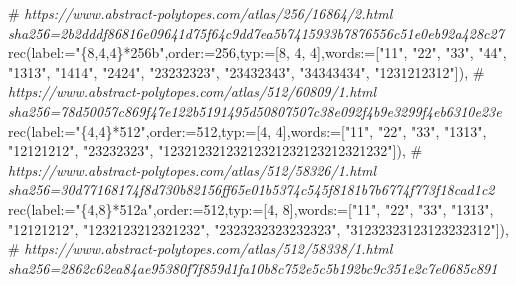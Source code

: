 \documentclass[
  10pt,
  letterpaper,
]{article}
\newenvironment{Shaded}{}{}
\newcommand{\CommentTok}[1]{\textcolor[rgb]{0.38,0.63,0.69}{\textit{#1}}}
\newcommand{\ExtensionTok}[1]{#1}
\newcommand{\FloatTok}[1]{\textcolor[rgb]{0.25,0.63,0.44}{#1}}
\newcommand{\NormalTok}[1]{#1}
\newcommand{\OperatorTok}[1]{\textcolor[rgb]{0.40,0.40,0.40}{#1}}
\newcommand{\StringTok}[1]{\textcolor[rgb]{0.25,0.44,0.63}{#1}}
\newcommand{\VariableTok}[1]{\textcolor[rgb]{0.10,0.09,0.49}{#1}}
\begin{document}
\begin{Shaded}
\begin{Highlighting}[]
\NormalTok{\#}\CommentTok{ https://www.abstract{-}polytopes.com/atlas/256/16864/2.html sha256=2b2dddf86816e09641d75f64c9dd7ea5b7415933b7876556c51e0eb92a428c27}
\ExtensionTok{rec}\NormalTok{(}\VariableTok{label}\OperatorTok{:=}\StringTok{"\{8,4,4\}*256b"}\OperatorTok{,}\VariableTok{order}\OperatorTok{:=}\FloatTok{256}\OperatorTok{,}\VariableTok{typ}\OperatorTok{:=}\NormalTok{[}\FloatTok{8}\OperatorTok{,} \FloatTok{4}\OperatorTok{,} \FloatTok{4}\NormalTok{]}\OperatorTok{,}\VariableTok{words}\OperatorTok{:=}\NormalTok{[}\StringTok{"11"}\OperatorTok{,} \StringTok{"22"}\OperatorTok{,} \StringTok{"33"}\OperatorTok{,} \StringTok{"44"}\OperatorTok{,} \StringTok{"1313"}\OperatorTok{,} \StringTok{"1414"}\OperatorTok{,} \StringTok{"2424"}\OperatorTok{,} \StringTok{"23232323"}\OperatorTok{,} \StringTok{"23432343"}\OperatorTok{,} \StringTok{"34343434"}\OperatorTok{,} \StringTok{"1231212312"}\NormalTok{])}\OperatorTok{,}
\NormalTok{\#}\CommentTok{ https://www.abstract{-}polytopes.com/atlas/512/60809/1.html sha256=78d50057c869f47e122b5191495d50807507c38e092f4b9e3299f4eb6310e23e}
\ExtensionTok{rec}\NormalTok{(}\VariableTok{label}\OperatorTok{:=}\StringTok{"\{4,4\}*512"}\OperatorTok{,}\VariableTok{order}\OperatorTok{:=}\FloatTok{512}\OperatorTok{,}\VariableTok{typ}\OperatorTok{:=}\NormalTok{[}\FloatTok{4}\OperatorTok{,} \FloatTok{4}\NormalTok{]}\OperatorTok{,}\VariableTok{words}\OperatorTok{:=}\NormalTok{[}\StringTok{"11"}\OperatorTok{,} \StringTok{"22"}\OperatorTok{,} \StringTok{"33"}\OperatorTok{,} \StringTok{"1313"}\OperatorTok{,} \StringTok{"12121212"}\OperatorTok{,} \StringTok{"23232323"}\OperatorTok{,} \StringTok{"12321232123212321232123212321232"}\NormalTok{])}\OperatorTok{,}
\NormalTok{\#}\CommentTok{ https://www.abstract{-}polytopes.com/atlas/512/58326/1.html sha256=30d77168174f8d730b82156ff65e01b5374c545f8181b7b6774f773f18cad1c2}
\ExtensionTok{rec}\NormalTok{(}\VariableTok{label}\OperatorTok{:=}\StringTok{"\{4,8\}*512a"}\OperatorTok{,}\VariableTok{order}\OperatorTok{:=}\FloatTok{512}\OperatorTok{,}\VariableTok{typ}\OperatorTok{:=}\NormalTok{[}\FloatTok{4}\OperatorTok{,} \FloatTok{8}\NormalTok{]}\OperatorTok{,}\VariableTok{words}\OperatorTok{:=}\NormalTok{[}\StringTok{"11"}\OperatorTok{,} \StringTok{"22"}\OperatorTok{,} \StringTok{"33"}\OperatorTok{,} \StringTok{"1313"}\OperatorTok{,} \StringTok{"12121212"}\OperatorTok{,} \StringTok{"1232123212321232"}\OperatorTok{,} \StringTok{"2323232323232323"}\OperatorTok{,} \StringTok{"31232323123123232312"}\NormalTok{])}\OperatorTok{,}
\NormalTok{\#}\CommentTok{ https://www.abstract{-}polytopes.com/atlas/512/58338/1.html sha256=2862c62ea84ae95380f7f859d1fa10b8c752e5c5b192bc9c351e2c7e0685c891}

\end{Highlighting}
\end{Shaded}
\end{document}

